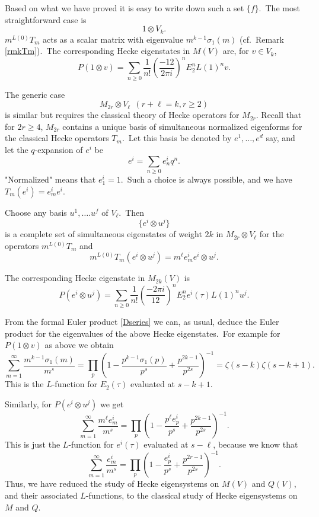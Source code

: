 \documentclass[12pt]{amsart}
\theoremstyle{plain}
\theoremstyle{definition}
\theoremstyle{remark}
\begin{document}
Based on what we have proved it is easy to write down such a set $\{f\}$.\ The most straightforward case is
$$1\otimes V_k.$$
$m^{L(0)}T_m$ acts as a scalar matrix
with eigenvalue $m^{k-1}\sigma_1(m)$
(cf.\ Remark \ref{rmkTm}).\ The corresponding  Hecke eigenstates in $M(V)$ are, for $v\in V_k$,
$$P(1\otimes v)=\sum_{n \geq 0} \frac{1}{n!}\left( 
\frac{-12}{2\pi i}\right)^n E_2^n L(1)^nv.$$

\medskip
The generic case 
$$M_{2r}\otimes V_{\ell}\ \  (r+\ell=k, r \geq 2)$$
is similar but requires the classical theory of Hecke operators for $M_{2r}$.
Recall that for $2r\geq 4$, $M_{2r}$ contains a unique basis of simultaneous normalized eigenforms for the classical Hecke operators $T_m$.\ Let this basis be denoted by $e^1, \hdots, e^d$ say, and  let the $q$-expansion of $e^i$ be
$$e^i = \sum_{n\geq0} e^i_nq^n.$$
"Normalized" means that $e^i_1=1$.\ Such  a choice is always possible, and we have
$T_m(e^i)=e^i_m e^i$.

\medskip
Choose any basis $u^1, \hdots. u^f$ of $V_{\ell}$.\ Then 
$$ \{ e^i\otimes u^j\}$$
is a complete set of simultaneous eigenstates
of weight $2k$ in $M_{2r}\otimes V_{\ell}$ for the operators $m^{L(0)}T_m$ and 
$$ m^{L(0)}T_m(e^i\otimes u^j) = m^{\ell}e^i_m e^i\otimes u^j.$$

The corresponding Hecke eigenstate in $M_{2k}(V)$ is
$$P(e^i\otimes u^j) = \sum_{n\geq0} \frac{1}{n!}\left(\frac{-2\pi i}{12}\right)^n E_2^ne^i(\tau) L(1)^nu^j.$$

\medskip
From the formal Euler product 
\eqref{Dseries} we can, as usual, deduce the Euler product for the eigenvalues of the above  Hecke eigenstates.\ For example for $P(1\otimes v)$ as above we obtain
$$\sum_{m=1}^{\infty} \frac{m^{k-1}\sigma_1(m)}{m^s}=\prod_p \left(1-\frac{p^{k-1}\sigma_1(p)}{p^s}+\frac{p^{2k-1}}{p^{2s}}\right)^{-1}=\zeta(s-k)\zeta(s-k+1).$$
This is the $L$-function for $E_2(\tau)$ evaluated at $s-k+1$.

\medskip
Similarly, for $P(e^i\otimes u^j)$ we get
$$\sum_{m=1}^{\infty} \frac{m^{\ell}e^i_m}{m^s}=\prod_p \left(1-\frac{p^{\ell}e^i_p}{p^s}+\frac{p^{2k-1}}{p^{2s}}\right)^{-1}.$$
This is just the $L$-function for $e^i(\tau)$ evaluated at $s-\ell$, because we know that
$$\sum_{m=1}^{\infty} \frac{e^i_m}{m^s}=\prod_p \left(1-\frac{e^i_p}{p^s}+\frac{p^{2r-1}}{p^{2s}}\right)^{-1}.$$
Thus, we have reduced the study of Hecke eigensystems on $M(V)$ and $Q(V)$, and their associated $L$-functions, to the classical study of Hecke eigensystems on $M$ and $Q$.
\end{document}

